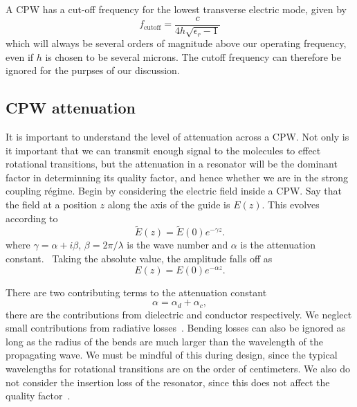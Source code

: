 A CPW has a cut-off frequency for the lowest transverse electric mode, given
by~\cite{Simons2004}
%
\begin{equation}
  f_\text{cutoff} = \frac{c}{4h\sqrt{\epsilon_r - 1}}
\end{equation}
%
which will always be several orders of magnitude above our operating frequency,
even if $h$ is chosen to be several microns. The cutoff frequency can therefore
be ignored for the purpses of our discussion.

\subsection{CPW attenuation}

It is important to understand the level of attenuation across a CPW. Not only
is it important that we can transmit enough signal to the molecules to effect
rotational transitions, but the attenuation in a resonator will be the dominant
factor in determinning its quality factor, and hence whether we are in the
strong coupling r\'egime. Begin by considering the electric field inside a CPW.
Say that the field at a position $z$ along the axis of the guide is $E(z)$.
This evolves according to
%
\begin{equation}
  \widetilde{E}(z) = \widetilde{E}(0)e^{-\gamma z}.
  \label{mws:eqn:Eloss}
\end{equation}
%
where $\gamma = \alpha + i\beta$, $\beta = 2\pi / \lambda$ is the wave
number and $\alpha$ is the attenuation constant.~\cite{Simons2004}
Taking the absolute value, the amplitude falls off as
%
\begin{equation}
  E(z) = E(0)e^{-\alpha z}.
\end{equation}

There are two contributing terms to the attenuation constant
%
\begin{equation}
  \alpha = \alpha_d + \alpha_c,
\end{equation}
%
there are the contributions from dielectric and conductor respectively.  We
neglect small contributions from radiative losses~\cite{Frankel1991}. Bending
losses can also be ignored as long as the radius of the bends are much larger
than the wavelength of the propagating wave. We must be mindful of this during
design, since the typical wavelengths for rotational transitions are on the
order of centimeters.  We also do not consider the insertion loss of the
resonator, since this does not affect the quality
factor~\cite{doi:10.1063/1.3010859}.

